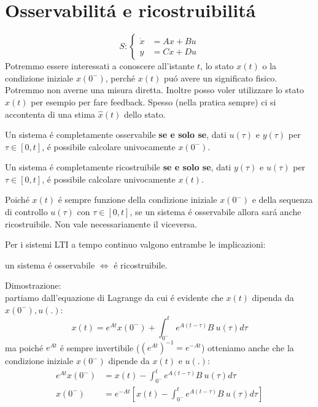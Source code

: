 \documentclass[../main.tex]{subfiles}
\begin{document}
	\section{Osservabilit\'a e ricostruibilit\'a}
		\[
			S:
			\begin{cases}
				\dot x &= Ax + Bu\\
				y &= Cx + Du
			\end{cases}
		\]
		Potremmo essere interessati a conoscere all'istante $ t $, lo stato $ x(t) $ o la condizione iniziale $ x(0^{-}) $, perch\'e $ x(t) $ pu\'o avere un significato fisico. Potremmo non averne una misura diretta. Inoltre posso voler utilizzare lo stato $ x(t) $ per esempio per fare feedback. Spesso (nella pratica sempre) ci si accontenta di una stima $ \hat x(t) $ dello stato.
		
		\begin{definition}
			Un sistema \'e completamente osservabile \textbf{se e solo se}, dati $ u(\tau) $ e $ y(\tau) $ per $ \tau \in [0,t] $, \'e possibile calcolare univocamente $ x(0^{-}) $.
		\end{definition}
	
		\begin{definition}
			Un sistema \'e completamente ricostruibile \textbf{se e solo se}, dati $ y(\tau) $ e $ u(\tau) $ per $ \tau \in [0,t] $, \'e possibile calcolare univocamente $ x(t) $.
		\end{definition}
	
		Poich\'e $ x(t) $ \'e sempre funzione della condizione iniziale $ x(0^{-}) $ e della sequenza di controllo $ u(\tau) $ con $ \tau \in [0,t] $, se un sistema \'e osservabile allora sar\'a anche ricostruibile. Non vale necessariamente il viceversa.
		
		Per i sistemi LTI a tempo continuo valgono entrambe le implicazioni:
		\begin{center}
			un sistema \'e osservabile $ \Leftrightarrow $ \'e ricostruibile.
		\end{center}
		Dimostrazione:\\
		partiamo dall'equazione di Lagrange da cui \'e evidente che $ x(t) $ dipenda da $ x(0^{-}), u(.) $:
		\[
			x(t) = e^{At}x(0^{-}) + \int_{0^{-}}^{t} e^{A(t-\tau)} B\ u(\tau) d\tau
		\]
		ma poich\'e $ e^{At} $ \'e sempre invertibile ($ (e^{At})^{-1} = e^{-At} $) otteniamo anche che la condizione iniziale $ x(0^{-}) $ dipende da $ x(t) $ e $ u(.) $:
		\begin{align*}
			e^{At} x(0^{-}) &= x(t) - \int_{0^{-}}^{t} e^{A(t-\tau)} B\ u(\tau) d\tau\\
			x(0^{-}) &= e^{-At} \left[ x(t) - \int_{0^{-}}^{t} e^{A(t-\tau)} B\ u(\tau) d\tau \right] 
		\end{align*}
\end{document}
